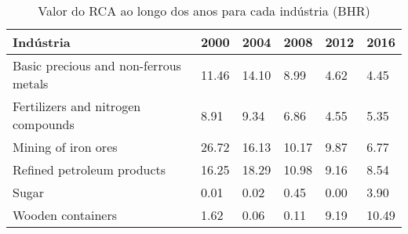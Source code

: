 \begin{table}
\centering
\caption{Valor do RCA ao longo dos anos para cada indústria (BHR)}
\begin{tabular}{p{6cm}p{1.5cm}p{1.5cm}p{1.5cm}p{1.5cm}p{1.5cm}}
\toprule
                            Indústria &  2000 &  2004 &  2008 & 2012 &  2016 \\
\midrule
Basic precious and non-ferrous metals & 11.46 & 14.10 &  8.99 & 4.62 &  4.45 \\
   Fertilizers and nitrogen compounds &  8.91 &  9.34 &  6.86 & 4.55 &  5.35 \\
                  Mining of iron ores & 26.72 & 16.13 & 10.17 & 9.87 &  6.77 \\
           Refined petroleum products & 16.25 & 18.29 & 10.98 & 9.16 &  8.54 \\
                                Sugar &  0.01 &  0.02 &  0.45 & 0.00 &  3.90 \\
                    Wooden containers &  1.62 &  0.06 &  0.11 & 9.19 & 10.49 \\
\bottomrule
\end{tabular}
\end{table}
